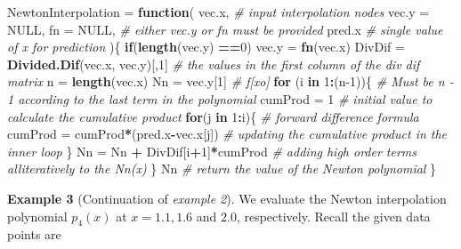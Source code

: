 \documentclass[
]{book}
\newenvironment{Shaded}{\begin{snugshade}}{\end{snugshade}}
\newcommand{\AttributeTok}[1]{\textcolor[rgb]{0.13,0.29,0.53}{#1}}
\newcommand{\CommentTok}[1]{\textcolor[rgb]{0.56,0.35,0.01}{\textit{#1}}}
\newcommand{\ConstantTok}[1]{\textcolor[rgb]{0.56,0.35,0.01}{#1}}
\newcommand{\ControlFlowTok}[1]{\textcolor[rgb]{0.13,0.29,0.53}{\textbf{#1}}}
\newcommand{\DecValTok}[1]{\textcolor[rgb]{0.00,0.00,0.81}{#1}}
\newcommand{\FunctionTok}[1]{\textcolor[rgb]{0.13,0.29,0.53}{\textbf{#1}}}
\newcommand{\NormalTok}[1]{#1}
\newcommand{\OtherTok}[1]{\textcolor[rgb]{0.56,0.35,0.01}{#1}}
\newcommand{\SpecialCharTok}[1]{\textcolor[rgb]{0.81,0.36,0.00}{\textbf{#1}}}
\begin{document}
\begin{Shaded}
\begin{Highlighting}[]
\NormalTok{NewtonInterpolation }\OtherTok{=} \ControlFlowTok{function}\NormalTok{( vec.x,            }\CommentTok{\# input interpolation nodes}
                                \AttributeTok{vec.y =} \ConstantTok{NULL}\NormalTok{,    }
                                \AttributeTok{fn =} \ConstantTok{NULL}\NormalTok{,        }\CommentTok{\# either vec.y or fn must be provided}
\NormalTok{                                pred.x            }\CommentTok{\# single value of x for prediction}
\NormalTok{                              )\{}
   \ControlFlowTok{if}\NormalTok{(}\FunctionTok{length}\NormalTok{(vec.y) }\SpecialCharTok{==}\DecValTok{0}\NormalTok{) vec.y }\OtherTok{=} \FunctionTok{fn}\NormalTok{(vec.x)}
\NormalTok{   DivDif }\OtherTok{=} \FunctionTok{Divided.Dif}\NormalTok{(vec.x, vec.y)[,}\DecValTok{1}\NormalTok{]       }\CommentTok{\# the values in the first column of the div dif matrix}
\NormalTok{   n }\OtherTok{=} \FunctionTok{length}\NormalTok{(vec.x)}
\NormalTok{   Nn }\OtherTok{=}\NormalTok{ vec.y[}\DecValTok{1}\NormalTok{]                  }\CommentTok{\# f[xo]}
   \ControlFlowTok{for}\NormalTok{ (i }\ControlFlowTok{in} \DecValTok{1}\SpecialCharTok{:}\NormalTok{(n}\DecValTok{{-}1}\NormalTok{))\{            }\CommentTok{\# Must be n {-} 1 according to the last term in the polynomial}
\NormalTok{     cumProd }\OtherTok{=} \DecValTok{1}                  \CommentTok{\# initial value to calculate the cumulative product}
     \ControlFlowTok{for}\NormalTok{(j }\ControlFlowTok{in} \DecValTok{1}\SpecialCharTok{:}\NormalTok{i)\{               }\CommentTok{\# forward difference formula}
\NormalTok{       cumProd }\OtherTok{=}\NormalTok{ cumProd}\SpecialCharTok{*}\NormalTok{(pred.x}\SpecialCharTok{{-}}\NormalTok{vec.x[j])   }\CommentTok{\# updating the cumulative product in the inner loop}
\NormalTok{     \}}
\NormalTok{     Nn }\OtherTok{=}\NormalTok{ Nn }\SpecialCharTok{+}\NormalTok{ DivDif[i}\SpecialCharTok{+}\DecValTok{1}\NormalTok{]}\SpecialCharTok{*}\NormalTok{cumProd    }\CommentTok{\# adding high order terms alliteratively to the Nn(x) }
\NormalTok{   \}}
\NormalTok{  Nn                                  }\CommentTok{\# return the value of the Newton polynomial}
\NormalTok{\}}
\end{Highlighting}
\end{Shaded}

\textbf{Example 3} (Continuation of \emph{example 2}). We evaluate the Newton interpolation polynomial \(p_4(x)\) at \(x = 1.1, 1.6\) and \(2.0\), respectively. Recall the given data points are
\end{document}
